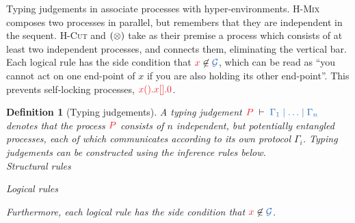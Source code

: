 \documentclass[submission,copyright,creativecommons]{eptcs}
\newtheorem{definition}[lemma]{Definition}
\begin{document}
Typing judgements in \hcp associate processes with hyper-environments. \textsc{H-Mix} composes two processes in parallel, but remembers that they are independent in the sequent. \textsc{H-Cut} and $(\otimes)$ take as their premise a process which consists of at least two independent processes, and connects them, eliminating the vertical bar. Each logical rule has the side condition that $\tm{x} \not\in \ty{\mathcal{G}}$, which can be read as ``you cannot act on one end-point of $x$ if you are also holding its other end-point''. This prevents self-locking processes, \eg $\tm{\piRecv{x}{}{\piBoundSend{x}{}{\piHalt}}}$.
\begin{definition}[Typing judgements]\label{def:hcp}
  A typing judgement $\seq[P]{\Gamma_1 \hsep \dots \hsep \Gamma_n}$ denotes that the process $\tm{P}$ consists of $n$ independent, but potentially entangled processes, each of which communicates according to its own protocol $\Gamma_i$. 
  Typing judgements can be constructed using the inference rules below. 
  \\[1\baselineskip]
  {Structural rules}
  \begin{center}
    \hcpInfAx
    \hcpInfCut
  \end{center}
  \begin{center}
    \hcpInfMix
    \hcpInfHalt
  \end{center}
  {Logical rules}
  \begin{center}
    \hcpInfBoundTens
    \hcpInfParr
  \end{center}
  \begin{center}
    \hcpInfOne
    \hcpInfBot
  \end{center}
  \begin{center}
  \end{center}
  \begin{center}
    \hcpInfWith
  \end{center}
  \begin{center}
    \hcpInfNil
    \hcpInfTop
  \end{center}
  Furthermore, each logical rule has the side condition that $\tm{x} \not\in \ty{\mathcal{G}}$.
\end{definition}\noindent
\end{document}
